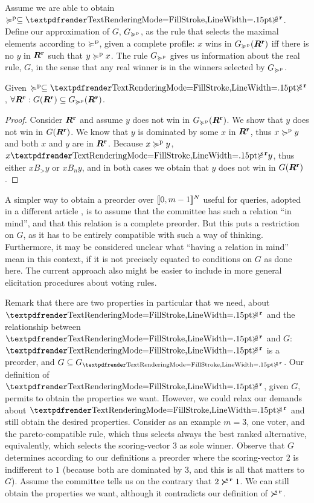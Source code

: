 \documentclass[version=last, pagesize, twoside=off, bibliography=totoc, DIV=calc, fontsize=14pt, a4paper, french, english]{scrartcl}
\begin{document}
Assume we are able to obtain $\pprefsv \subseteq \prefsv$. Define our approximation of $G$, $G_{\succcurlyeq^\text{p}}$, as the rule that selects the maximal elements according to $\succcurlyeq^\text{p}$, given a complete profile: $x$ wins in $G_{\succcurlyeq^\text{p}}(\boldsymbol{R}^\textbf{r})$ iff there is no $y$ in $\boldsymbol{R}^\textbf{r}$ such that $y \succcurlyeq^\text{p} x$. The rule $G_{\succcurlyeq^\text{p}}$ gives us information about the real rule, $G$, in the sense that any real winner is in the winners selected by $G_{\succcurlyeq^\text{p}}$.
\begin{fact}
	Given $\pprefsv \subseteq \prefsv$, $\forall \boldsymbol{R}^\textbf{r}: G(\boldsymbol{R}^\textbf{r}) \subseteq G_{\succcurlyeq^\text{p}}(\boldsymbol{R}^\textbf{r})$.
\end{fact}
\begin{proof}
	Consider $\boldsymbol{R}^\textbf{r}$ and assume $y$ does not win in $G_{\succcurlyeq^\text{p}}(\boldsymbol{R}^\textbf{r})$. We show that $y$ does not win in $G(\boldsymbol{R}^\textbf{r})$. We know that $y$ is dominated by some $x$ in $\boldsymbol{R}^\textbf{r}$, thus $x \succcurlyeq^\text{p} y$ and both $x$ and $y$ are in $\boldsymbol{R}^\textbf{r}$. Because $x \succcurlyeq^\text{p} y$, $x \prefsv y$, thus either $x B_> y$ or $x B_n y$, and in both cases we obtain that $y$ does not win in $G(\boldsymbol{R}^\textbf{r})$.
\end{proof}

A simpler way to obtain a preorder over $\lbrack\!\lbrack{}0, m-1\rbrack\!\rbrack^N$ useful for queries, adopted in a different article \citep{cailloux_eliciting_2014}, is to assume that the committee has such a relation “in mind”, and that this relation is a complete preorder. But this puts a restriction on $G$, as it has to be entirely compatible with such a way of thinking. Furthermore, it may be considered unclear what “having a relation in mind” mean in this context, if it is not precisely equated to conditions on $G$ as done here. The current approach also might be easier to include in more general elicitation procedures about voting rules.


Remark that there are two properties in particular that we need, about $\prefsv$ and the relationship between $\prefsv$ and $G$: $\prefsv$ is a preorder, and $G \subseteq G_{\prefsv}$. Our definition of $\prefsv$, given $G$, permits to obtain the properties we want. However, we could relax our demands about $\prefsv$ and still obtain the desired properties. Consider as an example $m = 3$, one voter, and the pareto-compatible rule, which thus selects always the best ranked alternative, equivalently, which selects the scoring-vector $3$ as sole winner. Observe that $G$ determines according to our definitions a preorder where the scoring-vector $2$ is indifferent to $1$ (because both are dominated by $3$, and this is all that matters to $G$). Assume the committee tells us on the contrary that $2 \mathrel{\boldsymbol{\succ}^{\text{\!\!\!s}\textbf{\,r}}} 1$. We can still obtain the properties we want, although it contradicts our definition of $\mathrel{\boldsymbol{\succ}^{\text{\!\!\!s}\textbf{\,r}}}$.
\end{document}
